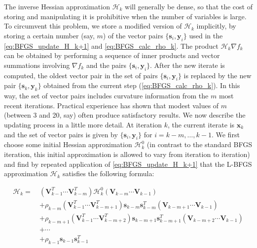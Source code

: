 The inverse Hessian approximation $\mathcal{H}_{k}$ will generally be dense, so that the cost of storing and manipulating it is prohibitive when the number of variables is large. To circumvent this problem, we store a modified version of $\mathcal{H}_{k}$ implicitly, by storing a certain number (say, $m$) of the vector pairs $\{\textbf{s}_i, \textbf{y}_i\}$ used in the \cref{eq:BFGS_update_H_k+1} and \cref{eq:BFGS_calc_rho_k}. The product $\mathcal{H}_{k} \nabla f_k$ can be obtained by performing a sequence of inner products and vector summations involving $\nabla f_k$ and the pairs $\{\textbf{s}_i, \textbf{y}_i\}$. After the new iterate is computed, the oldest vector pair in the set of pairs $\{\textbf{s}_i, \textbf{y}_i\}$ is replaced by the new pair $\{\textbf{s}_k, \textbf{y}_k\}$ obtained from the current step (\cref{eq:BFGS_calc_rho_k}). In this way, the set of vector pairs includes curvature information from the $m$ most recent iterations. Practical experience has shown that modest values of $m$ (between 3 and 20, say) often produce satisfactory results. We now describe the updating process in a little more detail. At iteration $k$, the current iterate is $\textbf{x}_k$ and the set of vector pairs is given by $\{\textbf{s}_i, \textbf{y}_i\}$ for $i=k-m,\ldots,k-1$. We first choose some initial Hessian approximation $\mathcal{H}_{k}^0$ (in contrast to the standard BFGS iteration, this initial approximation is allowed to vary from iteration to iteration) and find by repeated application of \cref{eq:BFGS_update_H_k+1} that the L-BFGS approximation $\mathcal{H}_{k}$ satisfies the following formula: \cite{Nocedal2006}

\begin{align}
  \mathcal{H}_{k} =\  & (\textbf{V}_{k-1}^T \cdots \textbf{V}_{k-m}^T) \mathcal{H}_{k}^0 (\textbf{V}_{k-m} \cdots \textbf{V}_{k-1})                                  \nonumber          \\
                     & + \rho_{k-m} (\textbf{V}_{k-1}^T \cdots \textbf{V}_{k-m+1}^T) \textbf{s}_{k-m} \textbf{s}_{k-m}^T (\textbf{V}_{k-m+1} \cdots \textbf{V}_{k-1}) \nonumber       \\
                     & + \rho_{k-m+1} (\textbf{V}_{k-1}^T \cdots \textbf{V}_{k-m+2}^T) \textbf{s}_{k-m+1} \textbf{s}_{k-m+1}^T (\textbf{V}_{k-m+2} \cdots \textbf{V}_{k-1}) \nonumber \\
                     & + \cdots \nonumber                                                                                                                                             \\
                     & + \rho_{k-1} \textbf{s}_{k-1} \textbf{s}_{k-1}^T
\end{align}

